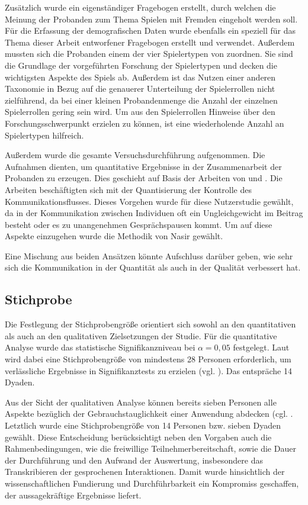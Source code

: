 Zusätzlich wurde ein eigenständiger Fragebogen erstellt, durch welchen die Meinung der Probanden zum Thema Spielen mit Fremden eingeholt werden soll.
Für die Erfassung der demografischen Daten wurde ebenfalls ein speziell für das Thema dieser Arbeit entworfener Fragebogen erstellt und verwendet. Außerdem mussten sich die Probanden einem der vier Spielertypen von \cite{bartle_hearts_1996} zuordnen. Sie sind die Grundlage der vorgeführten Forschung der Spielertypen und decken die wichtigsten Aspekte des Spiels ab. Außerdem ist das Nutzen einer anderen Taxonomie in Bezug auf die genauerer Unterteilung der Spielerrollen nicht zielführend, da bei einer kleinen Probandenmenge die Anzahl der einzelnen Spielerrollen gering sein wird. Um aus den Spielerrollen Hinweise über den Forschungsschwerpunkt erzielen zu können, ist eine wiederholende Anzahl an Spielertypen hilfreich.

Außerdem wurde die gesamte Versuchsdurchführung aufgenommen. Die Aufnahmen dienten, um quantitative Ergebnisse in der Zusammenarbeit der Probanden zu erzeugen. Dies geschieht auf Basis der Arbeiten von \cite{nasir_cooperative_2013} und \cite{nasir_effect_2015}. Die Arbeiten beschäftigten sich mit der Quantisierung der Kontrolle des Kommunikationsflusses. Dieses Vorgehen wurde für diese Nutzerstudie gewählt, da in der Kommunikation zwischen Individuen oft ein Ungleichgewicht im Beitrag besteht oder es zu unangenehmen Gesprächspausen kommt. Um auf diese Aspekte einzugehen wurde die Methodik von Nasir gewählt.

Eine Mischung aus beiden Ansätzen könnte Aufschluss darüber geben, wie sehr sich die Kommunikation in der Quantität als auch in der Qualität verbessert hat.

\subsection{Stichprobe}
Die Festlegung der Stichprobengröße orientiert sich sowohl an den quantitativen als auch an den qualitativen Zielsetzungen der Studie. Für die quantitative Analyse wurde das statistische Signifikanzniveau bei $\alpha = 0,05$ festgelegt. Laut \cite{cohen_power_1992} wird dabei eine Stichprobengröße von mindestens 28 Personen erforderlich, um verlässliche Ergebnisse in Signifikanztests zu erzielen (vgl. \cite[S. 158]{cohen_power_1992}). Das entspräche 14 Dyaden.

Aus der Sicht der qualitativen Analyse können bereits sieben Personen alle Aspekte bezüglich der Gebrauchstauglichkeit einer Anwendung abdecken (cgl. \cite[S. 3088]{turner_determining_2006}. 
Letztlich wurde eine Stichprobengröße von 14 Personen bzw. sieben Dyaden gewählt. Diese Entscheidung berücksichtigt neben den Vorgaben auch die Rahmenbedingungen, wie die freiwillige Teilnehmerbereitschaft, sowie die Dauer der Durchführung und den Aufwand der Auswertung, insbesondere das Transkribieren der 
gesprochenen Interaktionen. Damit wurde hinsichtlich der wissenschaftlichen Fundierung und Durchführbarkeit ein Kompromiss geschaffen, der aussagekräftige Ergebnisse liefert.

